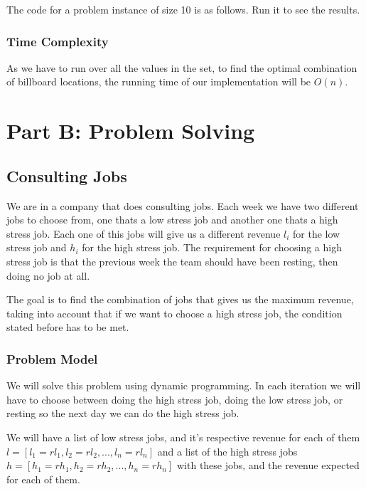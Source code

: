 \documentclass{article}
\begin{document}
The code for a problem instance of size 10 is as follows. Run it to see the results.



\subsubsection*{Time Complexity}
As we have to run over all the values in the set, to find the optimal combination of billboard locations, the running time of our implementation will be $O(n)$.

\section*{Part B: Problem Solving}


\subsection*{Consulting Jobs}

We are in a company that does consulting jobs. Each week we have two different jobs to choose from, one thats a low stress job and another one thats a high stress job. Each one of this jobs will give us a different revenue $l_i$ for the low stress job and $h_i$ for the high stress job. The requirement for choosing a high stress job is that the previous week the team should have been resting, then doing no job at all. 

The goal is to find the combination of jobs that gives us the maximum revenue, taking into account that if we want to choose a high stress job, the condition stated before has to be met.

\subsubsection*{Problem Model}

We will solve this problem using dynamic programming. In each iteration we will have to choose between doing the high stress job, doing the low stress job, or resting so the next day we can do the high stress job.

We will have a list of low stress jobs, and it's respective revenue for each of them $l = [l_1 = rl_1,l_2 = rl_2,...,l_n = rl_n]$ and a list of the high stress jobs $h = [h_1 = rh_1, h_2 = rh_2,...,h_n = rh_n]$ with these jobs, and the revenue expected for each of them.
\end{document}
